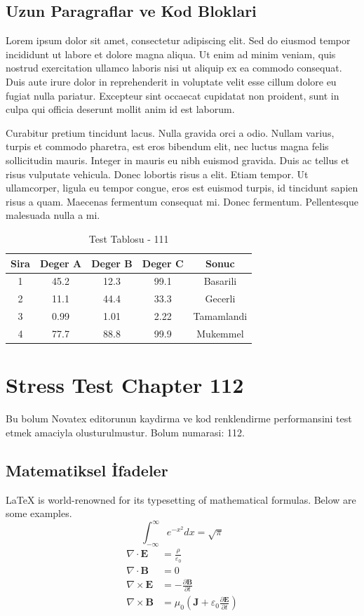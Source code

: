 \documentclass[12pt,a4paper]{article}
\begin{document}
\subsection{Uzun Paragraflar ve Kod Bloklari}
Lorem ipsum dolor sit amet, consectetur adipiscing elit. Sed do eiusmod tempor incididunt ut labore et dolore magna aliqua. Ut enim ad minim veniam, quis nostrud exercitation ullamco laboris nisi ut aliquip ex ea commodo consequat. Duis aute irure dolor in reprehenderit in voluptate velit esse cillum dolore eu fugiat nulla pariatur. Excepteur sint occaecat cupidatat non proident, sunt in culpa qui officia deserunt mollit anim id est laborum.

Curabitur pretium tincidunt lacus. Nulla gravida orci a odio. Nullam varius, turpis et commodo pharetra, est eros bibendum elit, nec luctus magna felis sollicitudin mauris. Integer in mauris eu nibh euismod gravida. Duis ac tellus et risus vulputate vehicula. Donec lobortis risus a elit. Etiam tempor. Ut ullamcorper, ligula eu tempor congue, eros est euismod turpis, id tincidunt sapien risus a quam. Maecenas fermentum consequat mi. Donec fermentum. Pellentesque malesuada nulla a mi.

\begin{table}[h!]
\centering
\begin{tabular}{|c|c|c|c|c|}
\hline
\textbf{Sira} & \textbf{Deger A} & \textbf{Deger B} & \textbf{Deger C} & \textbf{Sonuc} \\
\hline
1 & 45.2 & 12.3 & 99.1 & Basarili \\
2 & 11.1 & 44.4 & 33.3 & Gecerli \\
3 & 0.99 & 1.01 & 2.22 & Tamamlandi \\
4 & 77.7 & 88.8 & 99.9 & Mukemmel \\
\hline
\end{tabular}
\caption{Test Tablosu - 111}
\end{table}

\newpage
\section{Stress Test Chapter 112}
Bu bolum Novatex editorunun kaydirma ve kod renklendirme performansini test etmek amaciyla olusturulmustur. Bolum numarasi: 112.

\subsection{Matematiksel İfadeler}
\LaTeX{} is world-renowned for its typesetting of mathematical formulas. Below are some examples.
\begin{equation}
\int_{-\infty}^{\infty} e^{-x^2} dx = \sqrt{\pi}
\end{equation}
\begin{align}
\nabla \cdot \mathbf{E} &= \frac{\rho}{\varepsilon_0} \\
\nabla \cdot \mathbf{B} &= 0 \\
\nabla \times \mathbf{E} &= -\frac{\partial \mathbf{B}}{\partial t} \\
\nabla \times \mathbf{B} &= \mu_0\left(\mathbf{J} + \varepsilon_0 \frac{\partial \mathbf{E}}{\partial t}\right)
\end{align}
\end{document}
